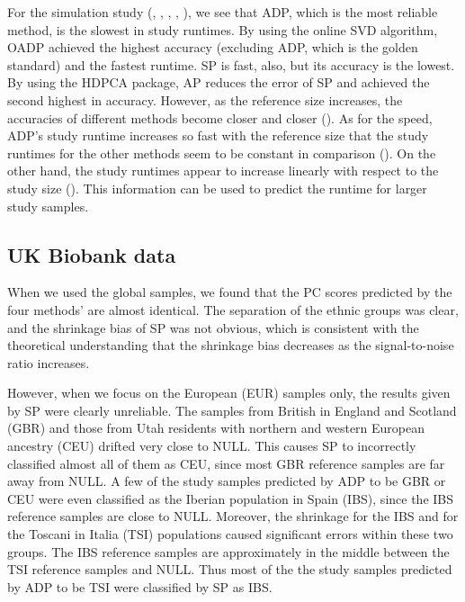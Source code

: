 \documentclass{article}
\begin{document}
For the simulation study
(, ,
, ,
),
we see that ADP, which is the most reliable method,
is the slowest in study runtimes.
By using the online SVD algorithm,
OADP achieved the highest accuracy (excluding ADP, which is the golden standard) and the fastest runtime.
SP is fast, also,
but its accuracy is the lowest.
By using the HDPCA package,
AP reduces the error of SP
and achieved the second highest in accuracy.
However, as the reference size increases,
the accuracies of different methods become closer and closer ().
As for the speed,
ADP's study runtime increases so fast with the reference size
that the study runtimes for the other methods seem to be constant in comparison ().
On the other hand,
the study runtimes appear to increase linearly with respect to the study size ().
This information can be used to predict the runtime for larger study samples.

\subsection{UK Biobank data}

When we used the global samples,
we found that the PC scores predicted by the four methods' are almost identical.
The separation of the ethnic groups was clear,
and the shrinkage bias of SP was not obvious,
which is consistent with the theoretical understanding
that the shrinkage bias decreases
as the signal-to-noise ratio increases.

However, when we focus on the European (EUR) samples only,
the results given by SP were clearly unreliable.
The samples from British in England and Scotland (GBR)
and those from Utah residents with northern and western European ancestry	(CEU)
drifted very close to NULL.
This causes SP to incorrectly classified almost all of them as CEU,
since most GBR reference samples are far away from NULL.
A few of the study samples predicted by ADP to be GBR or CEU
were even classified as the Iberian population in Spain (IBS),
since the IBS reference samples are close to NULL.
Moreover, the shrinkage for the IBS
and for the Toscani in Italia (TSI) populations
caused significant errors within these two groups.
The IBS reference samples
are approximately in the middle
between the TSI reference samples and NULL.
Thus most of the the study samples predicted by ADP to be TSI
were classified by SP as IBS.
\end{document}
